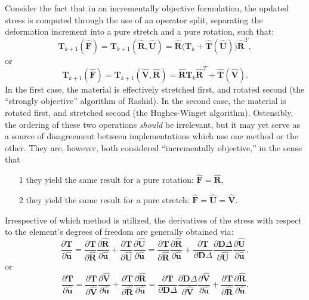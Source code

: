 \documentclass[11pt]{article} %
\begin{document}
Consider the fact that in an incrementally objective formulation, the updated stress is computed through the use of an operator split, separating the deformation increment into a pure stretch and a pure rotation, such that:
\begin{equation}
	\mathbf{T}_{k+1} (\hat{\mathbf{F}}) = \mathbf{T}_{k+1} (\hat{\mathbf{R}}, \hat{\mathbf{U}}) = \hat{\mathbf{R}} \big( \mathbf{T}_{k} + \hat{\mathbf{T}} (\hat{\mathbf{U}}) \big) \hat{\mathbf{R}}^T,
\end{equation}
or
\begin{equation}
	\mathbf{T}_{k+1} (\hat{\mathbf{F}}) = \mathbf{T}_{k+1} (\hat{\mathbf{V}}, \hat{\mathbf{R}}) = \hat{\mathbf{R}} \mathbf{T}_{k} \hat{\mathbf{R}}^T + \hat{\mathbf{T}} (\hat{\mathbf{V}}).
\end{equation}
In the first case, the material is effectively stretched first, and rotated second (the ``strongly objective'' algorithm of Rashid). In the second case, the material is rotated first, and stretched second (the Hughes-Winget algorithm). Ostensibly, the ordering of these two operations \textit{should} be irrelevant, but it may yet serve as a source of disagreement between implementations which use one method or the other. They are, however, both considered ``incrementally objective,'' in the sense that
\begin{itemize}
	\item[1] they yield the same result for a pure rotation: $\hat{\mathbf{F}} = \hat{\mathbf{R}}$,
	\item[2] they yield the same result for a pure stretch: $\hat{\mathbf{F}} = \hat{\mathbf{U}} = \hat{\mathbf{V}}$.
\end{itemize}
Irrespective of which method is utilized, the derivatives of the stress with respect to the element's degrees of freedom are generally obtained via:
\begin{equation}
	\frac{\partial \mathbf{T}}{\partial \hat{\mathbf{u}}} = \frac{\partial \mathbf{T}}{\partial \hat{\mathbf{R}}} \frac{\partial \hat{\mathbf{R}}}{\partial \hat{\mathbf{u}}} + \frac{\partial \mathbf{T}}{\partial \hat{\mathbf{U}}} \frac{\partial \hat{\mathbf{U}}}{\partial \hat{\mathbf{u}}} = \frac{\partial \mathbf{T}}{\partial \hat{\mathbf{R}}} \frac{\partial \hat{\mathbf{R}}}{\partial \hat{\mathbf{u}}} + \frac{\partial \mathbf{T}}{\partial \mathbf{D} \Delta} \frac{\partial \mathbf{D} \Delta}{\partial \hat{\mathbf{U}}} \frac{\partial \hat{\mathbf{U}}}{\partial \hat{\mathbf{u}}},
\end{equation}
or
\begin{equation}
	\frac{\partial \mathbf{T}}{\partial \hat{\mathbf{u}}} = \frac{\partial \mathbf{T}}{\partial \hat{\mathbf{V}}} \frac{\partial \hat{\mathbf{V}}}{\partial \hat{\mathbf{u}}} + \frac{\partial \mathbf{T}}{\partial \hat{\mathbf{R}}} \frac{\partial \hat{\mathbf{R}}}{\partial \hat{\mathbf{u}}} = \frac{\partial \mathbf{T}}{\partial \mathbf{D} \Delta} \frac{\partial \mathbf{D} \Delta}{\partial \hat{\mathbf{V}}} \frac{\partial \hat{\mathbf{V}}}{\partial \hat{\mathbf{u}}} + \frac{\partial \mathbf{T}}{\partial \hat{\mathbf{R}}} \frac{\partial \hat{\mathbf{R}}}{\partial \hat{\mathbf{u}}}.
\end{equation}
\end{document}
